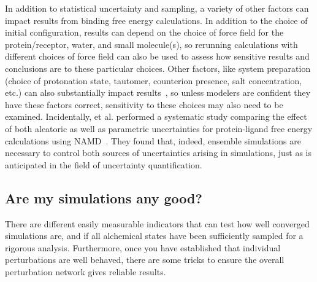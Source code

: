 \documentclass[9pt,bestpractices]{livecoms}
\begin{document}
In addition to statistical uncertainty and sampling, a variety of other factors can impact results from binding free energy calculations. In addition to the choice of initial configuration, results can depend on the choice of force field for the protein/receptor, water, and small molecule(s), so rerunning calculations with different choices of force field can also be used to assess how sensitive results and conclusions are to these particular choices. Other factors, like system preparation (choice of protonation state, tautomer, counterion presence, salt concentration, etc.) can also substantially impact results~\cite{mobley2017predicting, mobley2017predictinga}, so unless modelers are confident they have these factors correct, sensitivity to these choices may also need to be examined.
Incidentally, et al. performed a systematic study comparing the effect of both aleatoric as well as parametric uncertainties for protein-ligand free energy calculations using NAMD~\cite{vassaux2021}. They found that, indeed, ensemble simulations are necessary to control both sources of uncertainties arising in simulations, just as is anticipated in the field of uncertainty quantification.

\subsection{Are my simulations any good?}
\label{sec:are-they-good}
There are different easily measurable indicators that can test how well converged simulations are, and if all alchemical states have been sufficiently sampled for a rigorous analysis. Furthermore, once you have established that individual perturbations are well behaved, there are some tricks to ensure the overall perturbation network gives reliable results.
\end{document}
